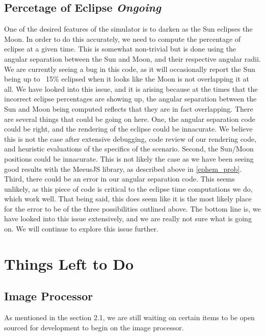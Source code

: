 \documentclass[10pt, onecolumn, draftclsnofoot, letterpaper, compsoc]{IEEEtran}
\begin{document}
\subsection{Percetage of Eclipse \textit{Ongoing}}
One of the desired features of the simulator is to darken as the Sun eclipses
the Moon. In order to do this accurately, we need to compute the percentage of
eclipse at a given time. This is somewhat non-trivial but is done using the
angular separation between the Sun and Moon, and their respective angular radii.
We are currently seeing a bug in this code, as it will occasionally report the Sun
being up to ~15\% eclipsed when it looks like the Moon is not overlapping it
at all. We have looked into this issue, and it is arising because at the times
that the incorrect eclipse percentages are showing up, the angular separation between
the Sun and Moon being computed reflects that they are in fact overlapping.
There are several things that could be going on here. One, the angular separation
code could be right, and the rendering of the eclipse could be innacurate.
We believe this is not the case after extensive debugging, code review of our
rendering code, and heuristic evaluations of the specifics of the scenario. Second,
the Sun/Moon positions could be innacurate. This is not likely the case as we have
been seeing good results with the MeeusJS library, as described above in \ref{ephem_prob}.
Third, there could be an error in our angular separation code. This seems unlikely,
as this piece of code is critical to the eclipse time computations we do, which
work well. That being said, this does seem like it is the most likely place for the
error to be of the three possibilities outlined above. The bottom line is,
we have looked into this issue extensively, and we are really not sure what is
going on. We will continue to explore this issue further.


\section{Things Left to Do}

\subsection{Image Processor}

As mentioned in the section 2.1, we are still waiting on certain items
to be open sourced for development to begin on the image processor.
\end{document}
